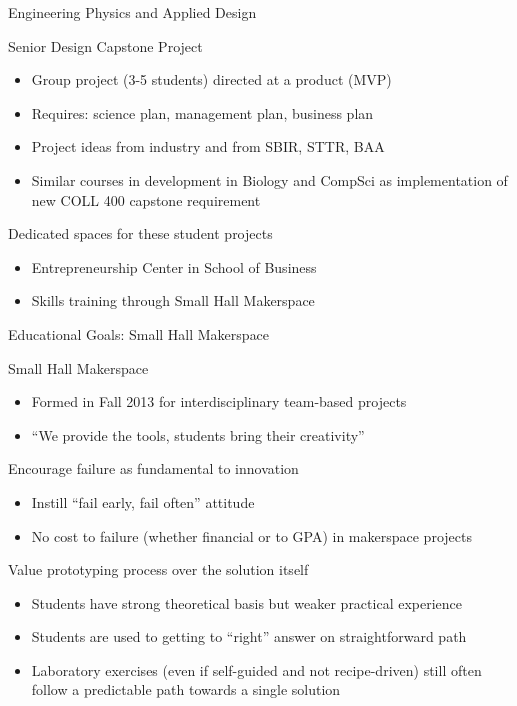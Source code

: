 \documentclass[xcolor={dvipsnames},professionalfonts]{beamer}
\begin{document}
\begin{frame}[allowframebreaks]{Engineering Physics and Applied Design}
\begin{block}{Senior Design Capstone Project}
  \begin{itemize}
   \item Group project (3-5 students) directed at a product (MVP)
   \item Requires: science plan, management plan, business plan
   \item Project ideas from industry and from SBIR, STTR, BAA
   \item Similar courses in development in Biology and CompSci as implementation of new COLL 400 capstone requirement
  \end{itemize}
 \end{block}
 \begin{block}{Dedicated spaces for these student projects}
  \begin{itemize}
   \item Entrepreneurship Center in School of Business
   \item Skills training through Small Hall Makerspace
  \end{itemize}
 \end{block}
\end{frame}

\begin{frame}{Educational Goals: Small Hall Makerspace}
 \begin{block}{Small Hall Makerspace}
  \begin{itemize}
   \item Formed in Fall 2013 for interdisciplinary team-based projects
   \item ``We provide the tools, students bring their creativity''
  \end{itemize}
 \end{block}
 \begin{block}{Encourage failure as fundamental to innovation}
  \begin{itemize}
   \item Instill ``fail early, fail often'' attitude
   \item No cost to failure (whether financial or to GPA) in makerspace projects
  \end{itemize}
 \end{block}
 \begin{block}{Value prototyping process over the solution itself}
  \begin{itemize}
   \item Students have strong theoretical basis but weaker practical experience
   \item Students are used to getting to ``right'' answer on straightforward path
   \item Laboratory exercises (even if self-guided and not recipe-driven) still often follow a predictable path towards a single solution
  \end{itemize}
 \end{block}
\end{frame}
\end{document}
